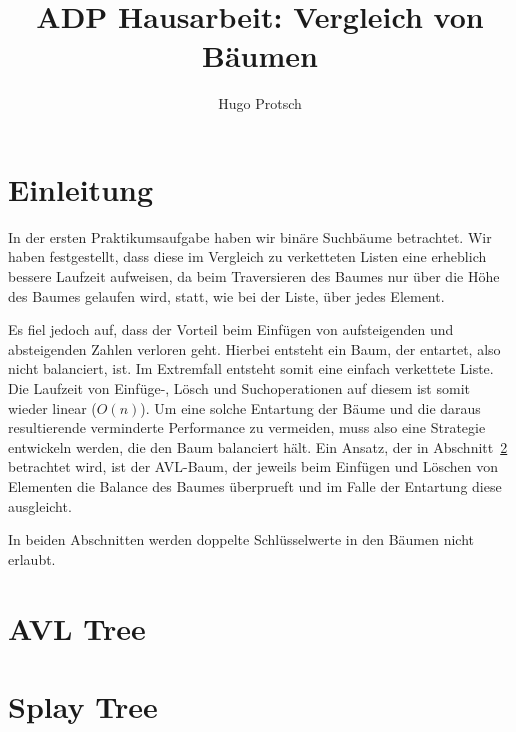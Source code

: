 \documentclass[11pt]{article}
\title{ADP Hausarbeit: Vergleich von Bäumen}
\author{Hugo Protsch}
\begin{document}
    \tableofcontents
    \newpage
    \section{Einleitung}\label{sec:Einleitung}

    In der ersten Praktikumsaufgabe haben wir binäre Suchbäume betrachtet.
    Wir haben festgestellt, dass diese im Vergleich zu verketteten Listen eine erheblich
    bessere Laufzeit aufweisen, da beim Traversieren des Baumes nur über die
    Höhe des Baumes gelaufen wird, statt, wie bei der Liste, über jedes Element.

    Es fiel jedoch auf, dass der Vorteil beim Einfügen von aufsteigenden und
    absteigenden Zahlen verloren geht.
    Hierbei entsteht ein Baum, der entartet, also nicht balanciert, ist.
    Im Extremfall entsteht somit eine einfach verkettete Liste.
    Die Laufzeit von Einfüge-, Lösch und Suchoperationen auf diesem
    ist somit wieder linear (\(O(n)\)).
    Um eine solche Entartung der Bäume und die daraus resultierende verminderte Performance
    zu vermeiden, muss also eine Strategie entwickeln werden, die den Baum balanciert hält.
    Ein Ansatz, der in Abschnitt~\ref{sec:avl-tree} betrachtet wird, ist der AVL-Baum,
    der jeweils beim Einfügen und Löschen von Elementen die
    Balance des Baumes überprueft und im Falle der Entartung diese ausgleicht.

    In beiden Abschnitten werden doppelte Schlüsselwerte in den Bäumen nicht
    erlaubt.


    \section{AVL Tree}\label{sec:avl-tree}
    


    \section{Splay Tree}\label{sec:splay-tree}
    
\end{document}
